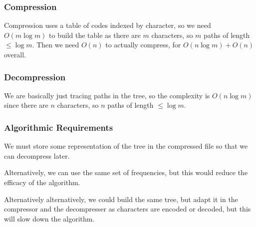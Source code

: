\subsubsection{Compression}\label{ssub:compression}

Compression uses a table of codes indexed by character, so we need \(O(m \log m)\) to build the table as there are \(m\) characters, so \(m\) paths of length \(\leq \log m\).
Then we need \(O(n)\) to actually compress, for \(O(n \log m) + O(n)\) overall.

\subsubsection{Decompression}\label{ssub:decompression}

We are basically just tracing paths in the tree, so the complexity is \(O(n \log m)\) since there are \(n\) characters, so \(n\) paths of length \(\leq \log m\).

\subsubsection{Algorithmic Requirements}\label{ssub:algorithmic_requirements}

We must store some representation of the tree in the compressed file so that we can decompress later.

Alternatively, we can use the same set of frequencies, but this would reduce the efficacy of the algorithm.

Alternatively alternatively, we could build the same tree, but adapt it in the compressor and the decompresser as characters are encoded or decoded, but this will slow down the algorithm.
